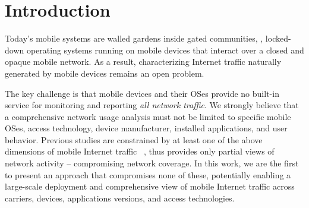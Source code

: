 \section{Introduction}
\label{sec:introduction}

Today's mobile systems are walled gardens inside gated communities, \ie{}, locked-down operating systems running on mobile devices that interact over a closed and opaque mobile network. 
As a result, characterizing Internet traffic naturally generated by mobile devices remains an open problem. 

The key challenge is that mobile devices and their OSes provide no built-in service for monitoring and reporting \emph{all network traffic}. 
We strongly believe that a comprehensive network usage analysis must not be limited to specific mobile OSes, access technology, device manufacturer, installed applications, and user behavior. 
Previous studies are constrained by at least one of the above dimensions of mobile Internet traffic ~\cite{vallina-rod:ads,gerber:passivespeed,chen:wifi,enck:taintdroid,wang:middleboxes,sommers:cellwifi}, thus provides only partial views of network activity -- compromising network coverage. 
In this work, we are the first to present an approach that compromises none of these, potentially enabling a large-scale deployment and comprehensive view of  mobile Internet traffic across carriers, devices, applications versions, and access technologies.


